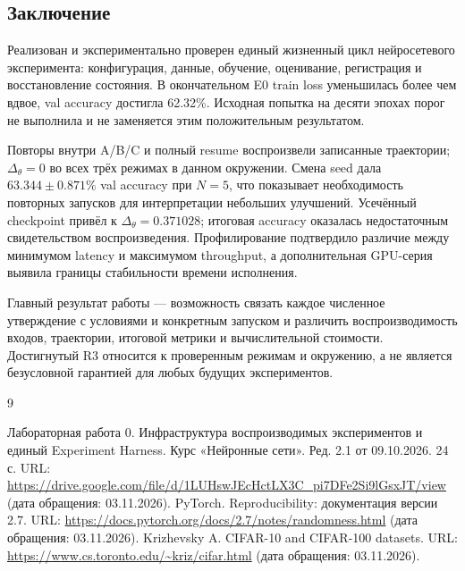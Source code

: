 \subsection{Заключение}
Реализован и экспериментально проверен единый жизненный цикл нейросетевого эксперимента: конфигурация, данные, обучение, оценивание, регистрация и восстановление состояния. В окончательном E0 train loss уменьшилась более чем вдвое, val accuracy достигла 62.32\%. Исходная попытка на десяти эпохах порог не выполнила и не заменяется этим положительным результатом.

Повторы внутри A/B/C и полный resume воспроизвели записанные траектории; $\Delta_\theta=0$ во всех трёх режимах в данном окружении. Смена seed дала $63.344\pm0.871\%$ val accuracy при $N=5$, что показывает необходимость повторных запусков для интерпретации небольших улучшений. Усечённый checkpoint привёл к $\Delta_\theta=0.371028$; итоговая accuracy оказалась недостаточным свидетельством воспроизведения. Профилирование подтвердило различие между минимумом latency и максимумом throughput, а дополнительная GPU-серия выявила границы стабильности времени исполнения.

Главный результат работы --- возможность связать каждое численное утверждение с условиями и конкретным запуском и различить воспроизводимость входов, траектории, итоговой метрики и вычислительной стоимости. Достигнутый R3 относится к проверенным режимам и окружению, а не является безусловной гарантией для любых будущих экспериментов.

\renewcommand{\refname}{Список использованных источников}
\begin{thebibliography}{9}
 Лабораторная работа 0. Инфраструктура воспроизводимых экспериментов и единый Experiment Harness. Курс «Нейронные сети». Ред. 2.1 от 09.10.2026. 24 с.\newline
URL: \url{https://drive.google.com/file/d/1LUHswJEcHctLX3C_pi7DFe2Si9lGsxJT/view}\newline
(дата обращения: 03.11.2026).
 PyTorch. Reproducibility: документация версии 2.7.\newline
URL: \url{https://docs.pytorch.org/docs/2.7/notes/randomness.html}\newline
(дата обращения: 03.11.2026).
 Krizhevsky A. CIFAR-10 and CIFAR-100 datasets.\newline
URL: \url{https://www.cs.toronto.edu/~kriz/cifar.html}\newline
(дата обращения: 03.11.2026).
\end{thebibliography}

